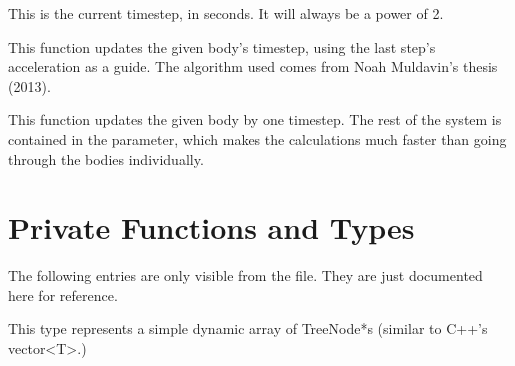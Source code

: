 \documentclass[letterpaper,10pt,english]{sphinxmanual}
\begin{document}
\begin{fulllineitems}
\label{\detokenize{body:c.tstep}}
\end{fulllineitems}


This is the current timestep, in seconds. It will always be a power of 2.

\begin{fulllineitems}
\label{\detokenize{body:c.update_timestep}}
\end{fulllineitems}


This function updates the given body’s timestep, using the last step’s acceleration as a guide. The algorithm used comes from Noah Muldavin’s thesis (2013).

\begin{fulllineitems}
\label{\detokenize{body:c.update_body}}
\end{fulllineitems}


This function updates the given body by one timestep. The rest of the system is contained in the  parameter, which makes the calculations much faster than going through the bodies individually.


\section{Private Functions and Types}
\label{\detokenize{body:private-functions-and-types}}
The following entries are only visible from the  file.
They are just documented here for reference.

\begin{fulllineitems}
\label{\detokenize{body:c.NodeList}}
\end{fulllineitems}


This type represents a simple dynamic array of TreeNode*s (similar to C++’s vector\textless{}T\textgreater{}.)
\end{document}
